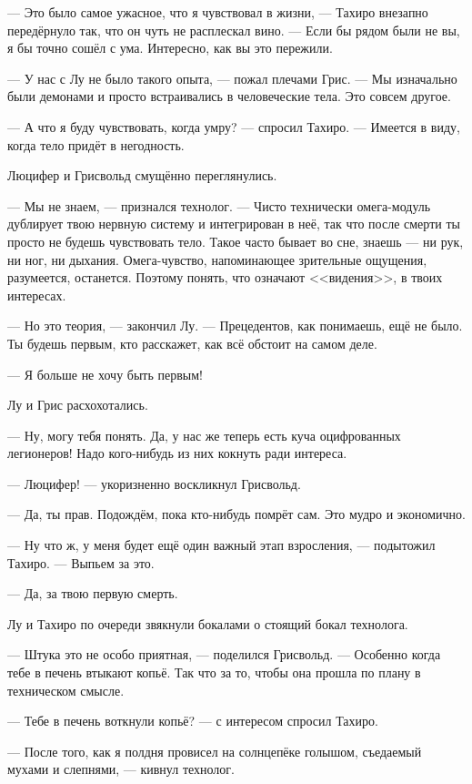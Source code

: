--- Это было самое ужасное, что я чувствовал в жизни, --- Тахиро внезапно передёрнуло так, что он чуть не расплескал вино.
--- Если бы рядом были не вы, я бы точно сошёл с ума.
Интересно, как вы это пережили.

--- У нас с Лу не было такого опыта, --- пожал плечами Грис.
--- Мы изначально были демонами и просто встраивались в человеческие тела.
Это совсем другое.

--- А что я буду чувствовать, когда умру? --- спросил Тахиро.
--- Имеется в виду, когда тело придёт в негодность.

Люцифер и Грисвольд смущённо переглянулись.

--- Мы не знаем, --- признался технолог.
--- Чисто технически омега-модуль дублирует твою нервную систему и интегрирован в неё, так что после смерти ты просто не будешь чувствовать тело.
Такое часто бывает во сне, знаешь --- ни рук, ни ног, ни дыхания.
Омега-чувство, напоминающее зрительные ощущения, разумеется, останется.
Поэтому понять, что означают <<видения>>, в твоих интересах.

--- Но это теория, --- закончил Лу.
--- Прецедентов, как понимаешь, ещё не было.
Ты будешь первым, кто расскажет, как всё обстоит на самом деле.

--- Я больше не хочу быть первым!

Лу и Грис расхохотались.

--- Ну, могу тебя понять.
Да, у нас же теперь есть куча оцифрованных легионеров!
Надо кого-нибудь из них кокнуть ради интереса.

--- Люцифер! --- укоризненно воскликнул Грисвольд.

--- Да, ты прав.
Подождём, пока кто-нибудь помрёт сам.
Это мудро и экономично.

--- Ну что ж, у меня будет ещё один важный этап взросления, --- подытожил Тахиро.
--- Выпьем за это.

--- Да, за твою первую смерть.

Лу и Тахиро по очереди звякнули бокалами о стоящий бокал технолога.

--- Штука это не особо приятная, --- поделился Грисвольд.
--- Особенно когда тебе в печень втыкают копьё.
Так что за то, чтобы она прошла по плану в техническом смысле.

--- Тебе в печень воткнули копьё? --- с интересом спросил Тахиро.

--- После того, как я полдня провисел на солнцепёке голышом, съедаемый мухами и слепнями, --- кивнул технолог.

